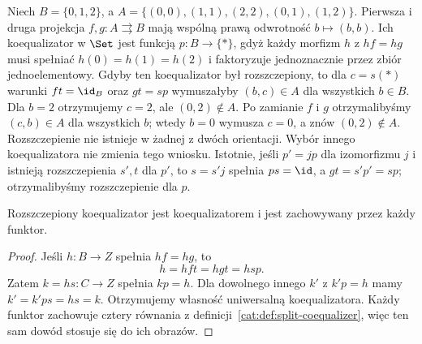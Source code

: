 \begin{przyklad}\label{cat:ex:reflexive-not-split}
Niech $B=\{0,1,2\}$, a $A=\{(0,0),(1,1),(2,2),(0,1),(1,2)\}$. Pierwsza i druga projekcja $f,g:A\rightrightarrows B$ mają wspólną prawą odwrotność $b\mapsto(b,b)$. Ich koequalizator w $\Set$ jest funkcją $p:B\to\{*\}$, gdyż każdy morfizm $h$ z $hf=hg$ musi spełniać $h(0)=h(1)=h(2)$ i faktoryzuje jednoznacznie przez zbiór jednoelementowy.
Gdyby ten koequalizator był rozszczepiony, to dla $c=s(*)$ warunki $ft=\id_B$ oraz $gt=sp$ wymuszałyby $(b,c)\in A$ dla wszystkich $b\in B$. Dla $b=2$ otrzymujemy $c=2$, ale $(0,2)\notin A$. Po zamianie $f$ i $g$ otrzymalibyśmy $(c,b)\in A$ dla wszystkich $b$; wtedy $b=0$ wymusza $c=0$, a znów $(0,2)\notin A$. Rozszczepienie nie istnieje w żadnej z dwóch orientacji. Wybór innego koequalizatora nie zmienia tego wniosku. Istotnie, jeśli $p'=jp$ dla izomorfizmu $j$ i istnieją rozszczepienia $s',t$ dla $p'$, to $s=s'j$ spełnia $ps=\id$, a $gt=s'p'=sp$; otrzymalibyśmy rozszczepienie dla $p$.
\end{przyklad}

\begin{lemat}\label{cat:lem:split-coequalizer-absolute}
Rozszczepiony koequalizator jest koequalizatorem i jest zachowywany przez każdy funktor.
\end{lemat}
\begin{proof}
Jeśli $h:B\to Z$ spełnia $hf=hg$, to
\[
 h=hft=hgt=hsp.
\]
Zatem $k=hs:C\to Z$ spełnia $kp=h$. Dla dowolnego innego $k'$ z $k'p=h$ mamy $k'=k'ps=hs=k$. Otrzymujemy własność uniwersalną koequalizatora. Każdy funktor zachowuje cztery równania z definicji~\ref{cat:def:split-coequalizer}, więc ten sam dowód stosuje się do ich obrazów.
\end{proof}

